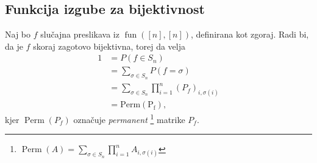 \documentclass[mat2, tisk]{fmfdelo}
\newcommand{\fun}{\operatorname{fun}}
\newcommand{\funnn}[1]{\fun([#1], [#1])}
\begin{document}
            \subsection{Funkcija izgube za bijektivnost}
            Naj bo $f$ slučajna preslikava iz $\funnn{n}$, definirana
            kot zgoraj. Radi bi, da je $f$ skoraj zagotovo
            bijektivna, torej da velja
            \begin{align*}
              1 &= P(f \in S_n) \\
              &= \sum_{\sigma  \in S_n} P(f =  \sigma) \\
              &= \sum_{\sigma  \in S_n} \prod_{i=1}^n (P_f)_{i, \sigma(i)} \\
              &= \operatorname{Perm(P_f)},
            \end{align*}
            kjer $\operatorname{Perm}(P_f)$ označuje \emph{permanent}
            \footnote{$\operatorname{Perm}(A) = \sum_{\sigma  \in
            S_n} \prod_{i=1}^n A_{i, \sigma(i)}$} matrike $P_f$.
\end{document}
